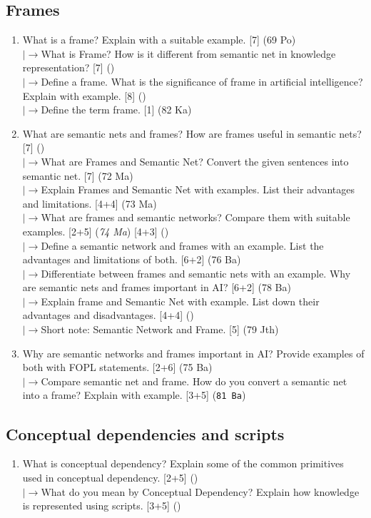 \documentclass[12pt]{article}
\newcommand{\lb}{\\$\left|\rightarrow\right.$}
\begin{document}
  \subsection{Frames}
    \begin{enumerate}[topsep=0pt, noitemsep]
      \item What is a frame? Explain with a suitable example. \hfill [7] (69 Po)
        \lb What is Frame? How is it different from semantic net in knowledge representation? \hfill [7] ()
        \lb Define a frame. What is the significance of frame in artificial intelligence? Explain with example. \hfill [8] ()
        \lb Define the term frame. \hfill [1] (82 Ka)

      \item What are semantic nets and frames? How are frames useful in semantic nets? \hfill [7] ()
        \lb What are Frames and Semantic Net? Convert the given sentences into semantic net. \hfill [7] (72 Ma)
        \lb Explain Frames and Semantic Net with examples. List their advantages and limitations. \hfill [4+4] (73 Ma)
        \lb What are frames and semantic networks? Compare them with suitable examples. \hfill [2+5] (\textit{74 Ma}) [4+3] ()
        \lb Define a semantic network and frames with an example. List the advantages and limitations of both. \hfill [6+2] (76 Ba)
        \lb Differentiate between frames and semantic nets with an example. Why are semantic nets and frames important in AI? \hfill [6+2] (78 Ba)
        \lb Explain frame and Semantic Net with example. List down their advantages and disadvantages. \hfill [4+4] ()
        \lb Short note: Semantic Network and Frame. \hfill [5] (79 Jth)

      \item Why are semantic networks and frames important in AI? Provide examples of both with FOPL statements. \hfill [2+6] (75 Ba)
        \lb Compare semantic net and frame. How do you convert a semantic net into a frame? Explain with example. \hfill [3+5] (\texttt{81 Ba})
    \end{enumerate}

  \subsection{Conceptual dependencies and scripts}
    \begin{enumerate}[topsep=0pt, noitemsep]
      \item What is conceptual dependency? Explain some of the common primitives used in conceptual dependency. \hfill [2+5] ()
        \lb What do you mean by Conceptual Dependency? Explain how knowledge is represented using scripts. \hfill [3+5] ()
    \end{enumerate}
\end{document}
